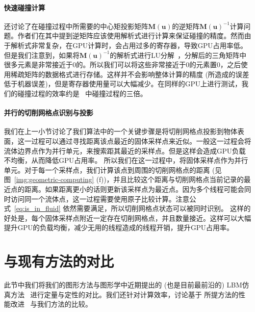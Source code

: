 \paragraph{快速碰撞计算}
\citet{Chen-2021} 还讨论了在碰撞过程中所需要的中心矩投影矩阵$\bm{M}(\bm{u})$的逆矩阵$\bm{M}(\bm{u})^{-1}$计算问题。作者们在其中提到逆矩阵应该使用解析式进行计算来保证碰撞的精度。然而由于解析式非常复杂，在GPU计算时，会占用过多的寄存器，导致GPU占用率低。但是我们注意到，如果将$\bm{M}(\bm{u})^{-1}$的解析式进行LU分解~\citep{fei2018three}，分解后的三角矩阵中很多元素是非常接近于0的。所以我们可以将这些非常接近于0的元素置0，之后使用稀疏矩阵的数据格式进行存储。这样并不会影响整体计算的精度 (所造成的误差低于机器误差)，但是寄存器使用量可以大幅减少。在同样的GPU上进行测试，我们的碰撞过程的效率约是~\citep{Chen-2021} 中碰撞过程的三倍。

\paragraph{并行的切削网格点识别与投影}
我们在上一小节讨论了我们算法中的一个关键步骤是将切削网格点投影到物体表面，这一过程可以通过寻找距离该点最近的固体采样点来近似。一般这一过程会将流体边界点作为并行单元，来搜索距其最近的采样点。但是这样会造成GPU负载不均衡，从而降低GPU占用率。
所以我们在这一过程中，将固体采样点作为并行单元。对于每一个采样点，我们计算该点到周围的切削网格点的距离 (见图~\ref{img:geometric-computing} (f))，并且比较这个距离与切削网格点当前记录的最近点的距离。如果距离更小的话则更新该采样点为最近点。因为多个线程可能会同时访问同一个流体点，这一过程需要使用原子比较计算。注意公式~\ref{eq:is_in_fluid} 依然需要满足，所以切削网格点状态可以被同时识别。
这样的好处是，每个固体采样点附近一定存在切削网格点，并且数量接近。这样可以大幅提升GPU的负载均衡，减少无用的线程造成的线程开销，提升GPU占用率。

\section{与现有方法的对比}
此节中我们将我们的图形方法与图形学中近期提出的 (也是目前最前沿的) LBM仿真方法~\citep{Li-2020} 进行定量与定性的对比。我们还针对计算效率，讨论基于 \citet{Li-2020} 所提方法的性能改进~\citep{Chen-2021} 与我们方法的比较。


